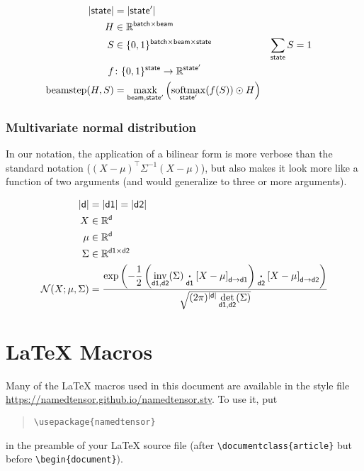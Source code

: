 \documentclass{article}
\newcommand{\reals}{\mathbb{R}}
\begin{document}
\begin{align*} 
|\name{state}| &= |\name{state'}| \\
H &\in \reals^{{\name{batch} \times \name{beam}}} \\
S &\in \{0, 1\}^{{\name{batch} \times \name{beam} \times \name{state}}} & \nsum{state} S &= 1\\
f &\colon \{0, 1\}^{{\name{state}}} \rightarrow \reals^{{\name{state'}}} \\ 
\text{beamstep}(H, S) &= \nfun{beam, state'}{maxk} \left( \nfun{state'}{softmax}(f(S)) \odot H \right)
\end{align*} 

\subsubsection{Multivariate normal distribution}

In our notation, the application of a bilinear form is more verbose than the standard notation ($(X-\mu)^\top \Sigma^{-1} (X-\mu)$), but also makes it look more like a function of two arguments (and would generalize to three or more arguments).

\begin{align*} 
|\name{d}| &= |\name{d1}| = |\name{d2}| \\
X &\in \reals^{\name{d}}  \\
\mu &\in \reals^{\name{d}}  \\
\Sigma & \in   \reals^{\name{d1} \times \name{d2}}  \\
{\cal N}(X; \mu, \Sigma) &= \frac{\displaystyle \exp\left(-\frac{1}{2}  \left(\nfun{d1, d2}{inv}(\Sigma) \ndot{d1} \nmov{d}{d1}{X - \mu} \right) \ndot{d2} \nmov{d}{d2}{X - \mu} \right)}{\sqrt{(2 \pi)^{|\name{d}|} \nfun{d1, d2}{det}(\Sigma)}}
\end{align*}

\section{\LaTeX{} Macros}

Many of the \LaTeX{} macros used in this document are available in the style file \url{https://namedtensor.github.io/namedtensor.sty}. To use it, put
\begin{quote}
\begin{verbatim}
\usepackage{namedtensor}
\end{verbatim}
\end{quote}
in the preamble of your \LaTeX{} source file (after \verb|\documentclass{article}| but before \verb|\begin{document}|).
\end{document}
